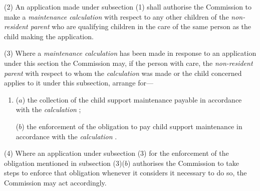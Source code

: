 \documentclass[12pt,a4paper]{article}
\begin{document}
(2) An application made under subsection (1)  shall authorise the 
Commission  %
to make a 
\emph{maintenance calculation}  %
with respect to any other children of the 
\emph{non-resident parent}  %
who are qualifying children in the care of the same person as the child making the application.

(3) Where a 
\emph{maintenance calculation}  %
has been made in response to an application under this section the 
Commission  %
may, if the person with care, the 
\emph{non-resident parent}  %
with respect to whom the 
\emph{calculation}  %
was made or the child concerned applies to 
it  %
under this subsection, arrange for—
\begin{enumerate}\item[]
($a$) the collection of the child support maintenance payable in accordance with the 
\emph{calculation}%
;

($b$) the enforcement of the obligation to pay child support maintenance in accordance with the 
\emph{calculation}%
.
\end{enumerate}

(4) Where an application under subsection (3)  for the enforcement of the obligation mentioned in subsection (3)($b$)  authorises the 
Commission  %
to take steps to enforce that obligation whenever 
it  %
considers it necessary to do so, the 
Commission  %
may act accordingly.
\end{document}
